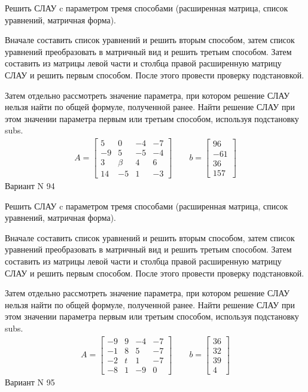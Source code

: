 \documentclass[11pt]{report}
\begin{document}
Решить СЛАУ c параметром тремя способами (расширенная матрица, список уравнений, матричная форма).

Вначале составить список уравнений и решить вторым способом,
затем список уравнений преобразовать в матричный вид и решить третьим способом.
Затем составить из матрицы левой части и столбца правой расширенную матрицу СЛАУ и решить первым способом.
После этого провести проверку подстановкой.

Затем отдельно рассмотреть значение параметра, при котором решение СЛАУ нельзя найти по общей формуле,
полученной ранее.
Найти решение СЛАУ при этом значении параметра первым или третьим способом, используя подстановку subs.
\begin{align*}
    A = \left[\begin{matrix}5 & 0 & -4 & -7\\-9 & 5 & -5 & -4\\3 & \beta & 4 & 6\\14 & -5 & 1 & -3\end{matrix}\right]
\qquad b = \left[\begin{matrix}96\\-61\\36\\157\end{matrix}\right]
\end{align*}
\newpage
Вариант N 94


Решить СЛАУ c параметром тремя способами (расширенная матрица, список уравнений, матричная форма).

Вначале составить список уравнений и решить вторым способом,
затем список уравнений преобразовать в матричный вид и решить третьим способом.
Затем составить из матрицы левой части и столбца правой расширенную матрицу СЛАУ и решить первым способом.
После этого провести проверку подстановкой.

Затем отдельно рассмотреть значение параметра, при котором решение СЛАУ нельзя найти по общей формуле,
полученной ранее.
Найти решение СЛАУ при этом значении параметра первым или третьим способом, используя подстановку subs.
\begin{align*}
    A = \left[\begin{matrix}-9 & 9 & -4 & -7\\-1 & 8 & 5 & -7\\-2 & t & 1 & -7\\-8 & 1 & -9 & 0\end{matrix}\right]
\qquad b = \left[\begin{matrix}36\\32\\39\\4\end{matrix}\right]
\end{align*}
\newpage
Вариант N 95
\end{document}
